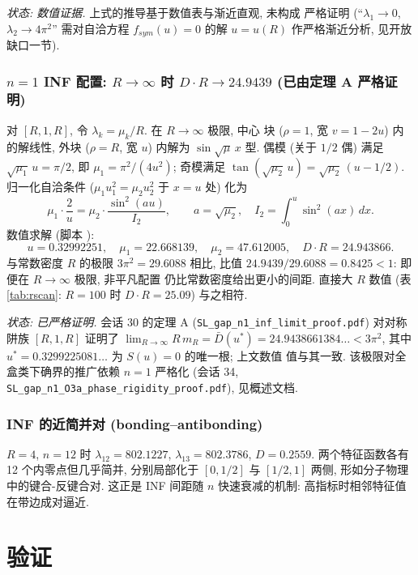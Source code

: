 \documentclass[UTF8]{ctexart}
\begin{document}
\noindent\emph{状态: 数值证据.} 上式的推导基于数值表与渐近直观, 未构成
严格证明 (``$\lambda_1\to0$, $\lambda_2\to4\pi^2$'' 需对自洽方程
$f_{sym}(u)=0$ 的解 $u=u(R)$ 作严格渐近分析, 见开放缺口一节).

\subsubsection{$n=1$ INF 配置: \texorpdfstring{$R \to \infty$}{R-inf} 时 \texorpdfstring{$D\cdot R \to 24.9439$}{DR-24.9439} (已由定理 A 严格证明)}

对 $[R, 1, R]$, 令 $\lambda_k = \mu_k/R$. 在 $R \to \infty$ 极限, 中心
块 ($\rho = 1$, 宽 $v = 1 - 2u$) 内的解线性, 外块 ($\rho = R$, 宽 $u$)
内解为 $\sin\sqrt{\mu}\,x$ 型. 偶模 (关于 $1/2$ 偶) 满足
$\sqrt{\mu_1}\,u = \pi/2$, 即 $\mu_1 = \pi^2/(4u^2)$; 奇模满足
$\tan(\sqrt{\mu_2}\,u) = \sqrt{\mu_2}\,(u - 1/2)$. 归一化自洽条件
($\mu_1 u_1^2 = \mu_2 u_2^2$ 于 $x = u$ 处) 化为
\[
	\mu_1 \cdot \frac{2}{u} = \mu_2 \cdot \frac{\sin^2(a u)}{I_2},
	\qquad a = \sqrt{\mu_2}, \quad
	I_2 = \int_0^u \sin^2(a x)\, dx.
\]
数值求解 (脚本 ):
\[
	u = 0.32992251, \quad \mu_1 = 22.668139, \quad
	\mu_2 = 47.612005, \quad D\cdot R = 24.943866.
\]
与常数密度 $R$ 的极限 $3\pi^2 = 29.6088$ 相比, 比值
$24.9439/29.6088 = 0.8425 < 1$: 即便在 $R \to \infty$ 极限, 非平凡配置
仍比常数密度给出更小的间距. 直接大 $R$ 数值 (表 \ref{tab:rscan}:
$R=100$ 时 $D \cdot R = 25.09$) 与之相符.

\noindent\emph{状态: 已严格证明.} 会话 30 的定理 A
(\texttt{SL\_gap\_n1\_inf\_limit\_proof.pdf}) 对对称阱族 $[R,1,R]$
证明了 $\lim_{R\to\infty} R\,m_R = \bar D(u^*) = 24.9438661384\ldots <
3\pi^2$, 其中 $u^* = 0.3299225081\ldots$ 为 $S(u)=0$ 的唯一根; 上文数值
值与其一致. 该极限对全盒类下确界的推广依赖 $n=1$ 严格化 (会话 34,
\texttt{SL\_gap\_n1\_O3a\_phase\_rigidity\_proof.pdf}), 见概述文档.

\subsubsection{INF 的近简并对 (bonding--antibonding)}

$R=4$, $n=12$ 时 $\lambda_{12} = 802.1227$, $\lambda_{13} = 802.3786$,
$D = 0.2559$. 两个特征函数各有 12 个内零点但几乎简并, 分别局部化于
$[0,1/2]$ 与 $[1/2,1]$ 两侧, 形如分子物理中的键合-反键合对. 这正是
INF 间距随 $n$ 快速衰减的机制: 高指标时相邻特征值在带边成对逼近.

\section{验证}\label{sec:verify}
\end{document}
